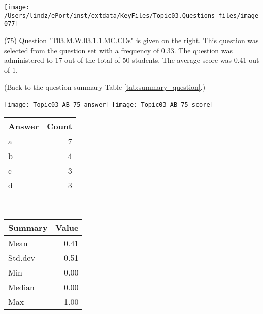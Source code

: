 \documentclass[12pt,english,nohyper]{tufte-handout}\usepackage[]{graphicx}\usepackage[]{color}
\begin{document}
\vspace{6cm}\begin{marginfigure}\texttt{[image: /Users/lindz/ePort/inst/extdata/KeyFiles/Topic03.Questions\_files/image077]}\end{marginfigure}\vspace{-6cm} (75) Question "T03.M.W.03.1.1.MC.CDs" is given on the right. This question was selected from the question set with a frequency of 0.33. The question was administered to 17 out of the total of 50 students. The average score was 0.41 out of 1.

 (Back to the question summary Table \ref{tab:summary_question}.)

\begin{center} \texttt{[image: Topic03\_AB\_75\_answer]} \texttt{[image: Topic03\_AB\_75\_score]} \end{center} 

\begin{center}%
\begin{tabular}{lr}
  \hline
Answer & Count \\ 
  \hline
a &   7 \\ 
  b &   4 \\ 
  c &   3 \\ 
  d &   3 \\ 
   \hline
\end{tabular}
~~~~~~~~%
\begin{tabular}{lr}
  \hline
Summary & Value \\ 
  \hline
Mean & 0.41 \\ 
  Std.dev & 0.51 \\ 
  Min & 0.00 \\ 
  Median & 0.00 \\ 
  Max & 1.00 \\ 
   \hline
\end{tabular}
\end{center}\newpage{}
\end{document}
